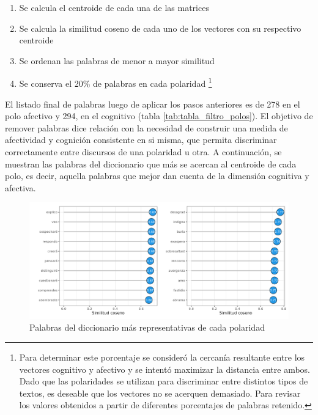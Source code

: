 \documentclass[
  12pt,
]{article}
\providecommand{\tightlist}{%
  \setlength{\itemsep}{0pt}\setlength{\parskip}{0pt}}
\begin{document}
\begin{enumerate}
\def\labelenumi{\arabic{enumi}.}
\tightlist
\item
  Se calcula el centroide de cada una de las matrices
\item
  Se calcula la similitud coseno de cada uno de los vectores con su
  respectivo centroide
\item
  Se ordenan las palabras de menor a mayor similitud
\item
  Se conserva el 20\% de palabras en cada polaridad
  \footnote{Para determinar este porcentaje se consideró la cercanía resultante entre los vectores cognitivo y afectivo y se intentó maximizar la distancia entre ambos. Dado que las polaridades se utilizan para discriminar entre distintos tipos de textos, es deseable que los vectores no se acerquen demasiado. Para revisar los valores obtenidos a partir de diferentes porcentajes de palabras retenido.}
\end{enumerate}

El listado final de palabras luego de aplicar los pasos anteriores es de
278 en el polo afectivo y 294, en el cognitivo (tabla
\ref{tab:tabla_filtro_polos}). El objetivo de remover palabras dice
relación con la necesidad de construir una medida de afectividad y
cognición consistente en si misma, que permita discriminar correctamente
entre discursos de una polaridad u otra. A continuación, se muestran las
palabras del diccionario que más se acercan al centroide de cada polo,
es decir, aquella palabras que mejor dan cuenta de la dimensión
cognitiva y afectiva.

\begin{figure}[H]
\centering
\large
\caption{Palabras del diccionario más representativas de cada polaridad}
\label{n_year}
\includegraphics[width = 0.7 \textwidth]{cuadros_tesis/plot_important_words.png}
\normalsize
\end{figure}
\end{document}
